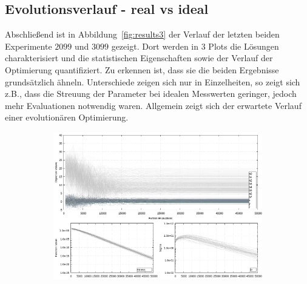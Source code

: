\subsection{Evolutionsverlauf - real vs ideal}
%
Abschließend ist in Abbildung~\ref{fig:results3} der Verlauf der letzten beiden Experimente $2099$ und $3099$ gezeigt. Dort werden in $3$ Plots die Lösungen charakterisiert und die statistischen Eigenschaften sowie der Verlauf der Optimierung quantifiziert. Zu erkennen ist, dass sie die beiden Ergebnisse grundsätzlich ähneln. Unterschiede zeigen sich nur in Einzelheiten, so zeigt sich z.B., dass die Streuung der Parameter bei idealen Messwerten geringer, jedoch mehr Evaluationen notwendig waren. Allgemein zeigt sich der erwartete Verlauf einer evolutionären Optimierung.
%
\begin{landscape}
\begin{figure}[!ht]
	\caption[Evolutionsverlauf der Ergebnisse]{ Diese Grafik zeigt den Verlauf der Evolution. Es werden die Beiden letzten Experimente $2099$ (opben, ideale Messdaten) und $3099$ (unten, reale Messdaten) gezeigt. Diese Plots dienen nur der Einschätzung über den generellen Verlauf der Evolution. Es ist nicht sinnvoll sie für alle Experimente hier darzustellen. Anhand des Boxplots (Mitte) erkennend man, dass die Resultate für ideale Messwerte nicht so stark streuen, die Lösung der realen Messdaten ist den der idealen mind. Ebenbürtig. Es zeigt sich sogar, dass weniger Evaluationen der Zielfunktion bei den realen Werten nötig waren.}
	\label{fig:results3}
	\vspace{3mm}
	\centering
	\begin{subfigure}[t]{0.45\textheight}
	     \centering
	     \includegraphics[width=\textwidth]{img/evo/lines2089.png}

\end{subfigure}
\end{figure}
\end{landscape}

